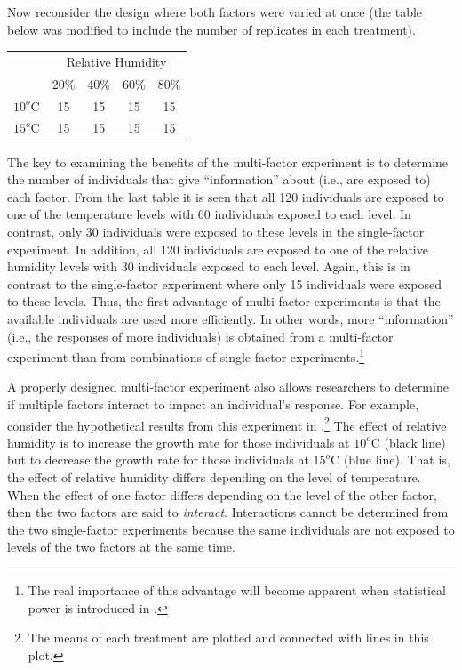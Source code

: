 \documentclass[10pt,openany]{book}\usepackage[]{graphicx}\usepackage[]{color}
\begin{document}
Now reconsider the design where both factors were varied at once (the table below was modified to include the number of replicates in each treatment).

\begin{center}
\begin{tabular}{cc|c|c|c}
 & \multicolumn{4}{c}{Relative Humidity} \\
\cline{2-5}
 & 20\% & 40\% & 60\% & 80\% \\
\cline{2-5}
\multicolumn{1}{c|}{$10^{o}$C} & 15 & 15 & 15 & \multicolumn{1}{c|}{15} \\
\hline
\multicolumn{1}{c|}{$15^{o}$C} & 15 & 15 & 15 & \multicolumn{1}{c|}{15} \\
\cline{2-5}
\end{tabular}
\end{center}

The key to examining the benefits of the multi-factor experiment is to determine the number of individuals that give ``information'' about (i.e., are exposed to) each factor.  From the last table it is seen that all 120 individuals are exposed to one of the temperature levels with 60 individuals exposed to each level.  In contrast, only 30 individuals were exposed to these levels in the single-factor experiment.  In addition, all 120 individuals are exposed to one of the relative humidity levels with 30 individuals exposed to each level.  Again, this is in contrast to the single-factor experiment where only 15 individuals were exposed to these levels.  Thus, the first advantage of multi-factor experiments is that the available individuals are used more efficiently.  In other words, more ``information'' (i.e., the responses of more individuals) is obtained from a multi-factor experiment than from combinations of single-factor experiments.\footnote{The real importance of this advantage will become apparent when statistical power is introduced in .}


A properly designed multi-factor experiment also allows researchers to determine if multiple factors interact to impact an individual's response.  For example, consider the hypothetical results from this experiment in .\footnote{The means of each treatment are plotted and connected with lines in this plot.}  The effect of relative humidity is to increase the growth rate for those individuals at $10^{o}$C (black line) but to decrease the growth rate for those individuals at $15^{o}$C (blue line).  That is, the effect of relative humidity differs depending on the level of temperature.  When the effect of one factor differs depending on the level of the other factor, then the two factors are said to \textit{interact}.  Interactions cannot be determined from the two single-factor experiments because the same individuals are not exposed to levels of the two factors at the same time.
\end{document}
